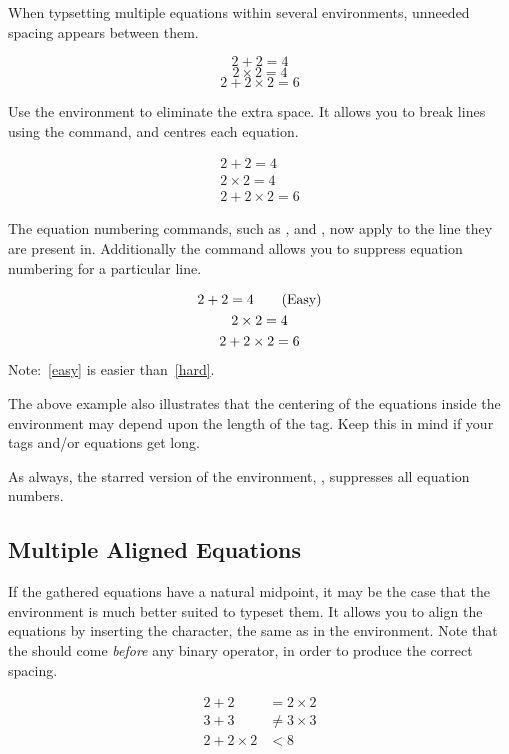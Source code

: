 When typsetting multiple equations within several  environments,
unneeded spacing appears between them.
\begin{example}
\begin{equation}
  2 + 2 = 4
\end{equation}
\begin{equation}
  2 \times 2 = 4
\end{equation}
\begin{equation}
  2 + 2 \times 2 = 6
\end{equation}
\end{example}
Use the  environment to eliminate the extra space. It allows you to break
lines using the \csi{\bs} command, and centres each equation.
\begin{example}
\begin{gather}
  2 + 2 = 4 \\
  2 \times 2 = 4 \\
  2 + 2 \times 2 = 6
\end{gather}
\end{example}
The equation numbering commands, such as ,  and ,
now apply to the line they are present in. Additionally the command
 allows you to suppress equation numbering for a
particular line.
\begin{example}
\begin{gather}
  2 + 2 = 4
    \tag{Easy}\label{easy} \\
  2 \times 2 = 4 \notag \\
  2 + 2 \times 2 = 6
    \label{hard}
\end{gather}
Note:~\eqref{easy} is easier
than~\eqref{hard}.
\end{example}
The above example also illustrates that the centering of the equations inside
the environment may depend upon the length of the tag. Keep this in mind if
your tags and/or equations get long.

As always, the starred version of the environment, , suppresses
all equation numbers.

\subsection{Multiple Aligned Equations}\label{sec:aligned_equations}

If the gathered equations have a natural midpoint, it may be the case that the
 environment is much better suited to typeset them. It allows you to
align the equations by inserting the \ai{\&} character, the same as in the
 environment. Note that the \ai{\&} should come \emph{before} any
binary operator, in order to produce the correct spacing.
\begin{example}
\begin{align}
  2 + 2 & = 2 \times 2 \\
  3 + 3 & \neq 3 \times 3 \\
  2 + 2 \times 2 & < 8
\end{align}
\end{example}

